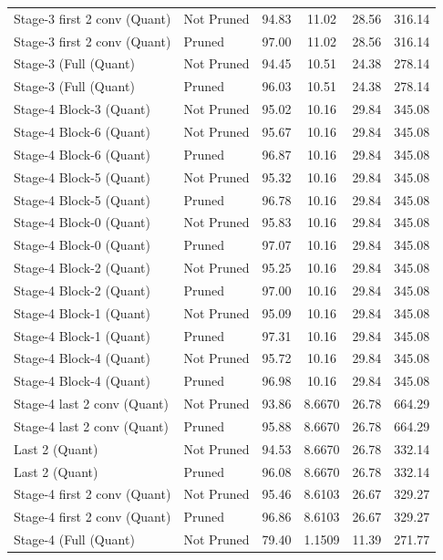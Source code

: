 \begin{table}
\begin{tabular}{llcccc}
Stage-3 first 2 conv
(Quant) & Not Pruned & 94.83 & 11.02 & 28.56 & 316.14 \\
Stage-3 first 2 conv
(Quant) & Pruned & 97.00 & 11.02 & 28.56 & 316.14 \\
Stage-3 (Full
(Quant) & Not Pruned & 94.45 & 10.51 & 24.38 & 278.14 \\
Stage-3 (Full
(Quant) & Pruned & 96.03 & 10.51 & 24.38 & 278.14 \\
Stage-4 Block-3
(Quant) & Not Pruned & 95.02 & 10.16 & 29.84 & 345.08 \\
Stage-4 Block-6
(Quant) & Not Pruned & 95.67 & 10.16 & 29.84 & 345.08 \\
Stage-4 Block-6
(Quant) & Pruned & 96.87 & 10.16 & 29.84 & 345.08 \\
Stage-4 Block-5
(Quant) & Not Pruned & 95.32 & 10.16 & 29.84 & 345.08 \\
Stage-4 Block-5
(Quant) & Pruned & 96.78 & 10.16 & 29.84 & 345.08 \\
Stage-4 Block-0
(Quant) & Not Pruned & 95.83 & 10.16 & 29.84 & 345.08 \\
Stage-4 Block-0
(Quant) & Pruned & 97.07 & 10.16 & 29.84 & 345.08 \\
Stage-4 Block-2
(Quant) & Not Pruned & 95.25 & 10.16 & 29.84 & 345.08 \\
Stage-4 Block-2
(Quant) & Pruned & 97.00 & 10.16 & 29.84 & 345.08 \\
Stage-4 Block-1
(Quant) & Not Pruned & 95.09 & 10.16 & 29.84 & 345.08 \\
Stage-4 Block-1
(Quant) & Pruned & 97.31 & 10.16 & 29.84 & 345.08 \\
Stage-4 Block-4
(Quant) & Not Pruned & 95.72 & 10.16 & 29.84 & 345.08 \\
Stage-4 Block-4
(Quant) & Pruned & 96.98 & 10.16 & 29.84 & 345.08 \\
Stage-4 last 2 conv
(Quant) & Not Pruned & 93.86 & 8.6670 & 26.78 & 664.29 \\
Stage-4 last 2 conv
(Quant) & Pruned & 95.88 & 8.6670 & 26.78 & 664.29 \\
Last 2
(Quant) & Not Pruned & 94.53 & 8.6670 & 26.78 & 332.14 \\
Last 2
(Quant) & Pruned & 96.08 & 8.6670 & 26.78 & 332.14 \\
Stage-4 first 2 conv
(Quant) & Not Pruned & 95.46 & 8.6103 & 26.67 & 329.27 \\
Stage-4 first 2 conv
(Quant) & Pruned & 96.86 & 8.6103 & 26.67 & 329.27 \\
Stage-4 (Full
(Quant) & Not Pruned & 79.40 & 1.1509 & 11.39 & 271.77 \\

\end{tabular}
\end{table}
